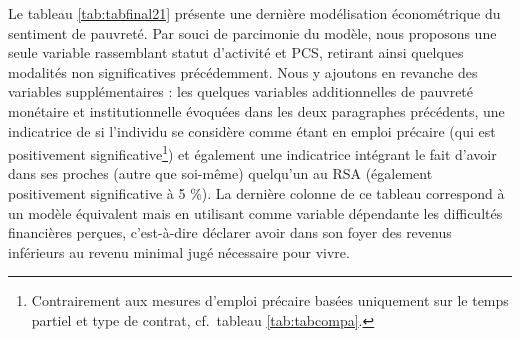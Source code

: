 \documentclass[12pt,a4paper]{reedthesis}
\begin{document}
Le tableau \ref{tab:tabfinal21} présente une dernière modélisation économétrique du sentiment de pauvreté. Par souci de parcimonie du modèle, nous proposons une seule variable rassemblant statut d'activité et PCS, retirant ainsi quelques modalités non significatives précédemment. Nous y ajoutons en revanche des variables supplémentaires : les quelques variables additionnelles de pauvreté monétaire et institutionnelle évoquées dans les deux paragraphes précédents, une indicatrice de si l'individu se considère comme étant en emploi précaire (qui est positivement significative\footnote{Contrairement aux mesures d'emploi précaire basées uniquement sur le temps partiel et type de contrat, cf.~tableau \ref{tab:tabcompa}.}) et également une indicatrice intégrant le fait d'avoir dans ses proches (autre que soi-même) quelqu'un au RSA (également positivement significative à 5 \%). La dernière colonne de ce tableau correspond à un modèle équivalent mais en utilisant comme variable dépendante les difficultés financières perçues, c'est-à-dire déclarer avoir dans son foyer des revenus inférieurs au revenu minimal jugé nécessaire pour vivre.
\end{document}
